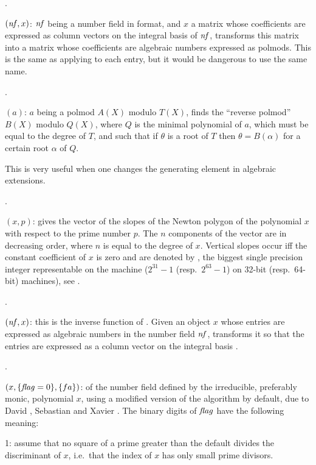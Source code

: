 .

$(\hbox{\it nf\/},x)$: $\hbox{\it nf\/}$ being a number field in
 format, and $x$ a matrix whose coefficients are expressed as
column vectors on the integral basis of $\hbox{\it nf\/}$, transforms this matrix
into a matrix whose coefficients are algebraic numbers expressed as
polmods. This is the same as applying  to each entry, but
it would be dangerous to use the same name.

.

$(a)$: $a$ being a polmod $A(X)$ modulo $T(X)$, finds
the ``reverse polmod'' $B(X)$ modulo $Q(X)$, where $Q$ is the minimal
polynomial of $a$, which must be equal to the degree of $T$, and such that if
$\theta$ is a root of $T$ then $\theta=B(\alpha)$ for a certain root $\alpha$
of $Q$.

This is very useful when one changes the generating element in algebraic
extensions.

.

$(x,p)$: gives the vector of the slopes of the Newton
polygon of the polynomial $x$ with respect to the prime number $p$. The $n$
components of the vector are in decreasing order, where $n$ is equal to the
degree of $x$. Vertical slopes occur iff the constant coefficient of $x$ is
zero and are denoted by , the biggest single precision
integer representable on the machine ($2^{31}-1$ (resp.~$2^{63}-1$) on 32-bit
(resp.~64-bit) machines), see .

.

$(\hbox{\it nf\/},x)$: this is the inverse function of
. Given an object $x$ whose entries are expressed as
algebraic numbers in the number field $\hbox{\it nf\/}$, transforms it so that the
entries are expressed as a column vector on the integral basis
.

.

$(x,\{\hbox{\it f\kern0pt lag\/}=0\},\{fa\})$:  of the number
field defined by the irreducible, preferably monic, polynomial $x$, using a
modified version of the  algorithm by default, due to David
, Sebastian  and Xavier . The binary digits
of $\hbox{\it f\kern0pt lag\/}$ have the following meaning:

1: assume that no square of a prime greater than the default 
divides the discriminant of $x$, i.e.~that the index of $x$ has only small
prime divisors.

